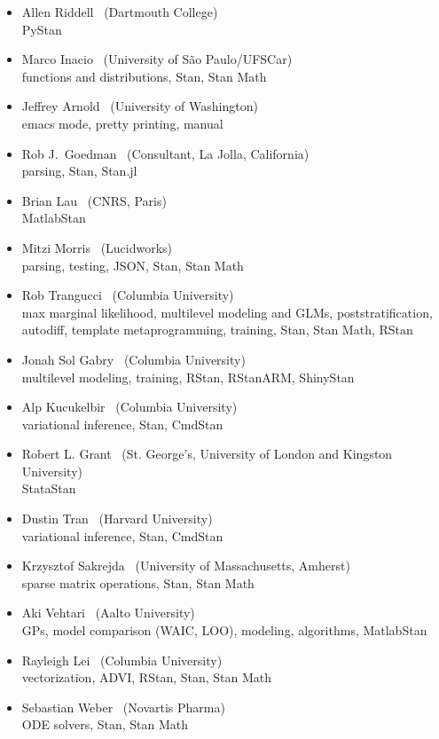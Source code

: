 \begin{itemize}
\\ {\footnotesize modeling, Stan, RStan}
\item Allen Riddell \   (Dartmouth College)
\\ {\footnotesize PyStan}
\item Marco Inacio \   (University of S\~{a}o Paulo/UFSCar)
\\ {\footnotesize functions and distributions, Stan, Stan Math}
\item Jeffrey Arnold \   (University of Washington)
\\ {\footnotesize emacs mode, pretty printing, manual}
\item Rob J.\ Goedman \ (Consultant, La Jolla, California)
\\ {\footnotesize parsing, Stan, Stan.jl}
\item Brian Lau \ (CNRS, Paris)
\\ {\footnotesize MatlabStan}
\item Mitzi Morris \   (Lucidworks)
\\ {\footnotesize parsing, testing, JSON, Stan, Stan Math}
\item Rob Trangucci \   (Columbia University)
\\ {\footnotesize max marginal likelihood, multilevel modeling and
  GLMs, poststratification, autodiff, template metaprogramming, 
  training, Stan, Stan Math, RStan}
\item Jonah Sol Gabry \ (Columbia University)
\\ {\footnotesize multilevel modeling, training, RStan, RStanARM, ShinyStan}
\item Alp Kucukelbir \ (Columbia University)
\\ {\footnotesize variational inference, Stan, CmdStan}
\item Robert L. Grant \ (St. George's, University of London and
  Kingston University)
\\ {\footnotesize StataStan}
\item Dustin Tran \ (Harvard University)
\\ {\footnotesize variational inference, Stan, CmdStan}
\item Krzysztof Sakrejda \ (University of Massachusetts, Amherst)
\\ {\footnotesize sparse matrix operations, Stan, Stan Math}
\item Aki Vehtari \ (Aalto University)
\\ {\footnotesize GPs, model comparison (WAIC, LOO), modeling,
  algorithms, MatlabStan}
\item Rayleigh Lei \ (Columbia University)
\\ {\footnotesize vectorization, ADVI, RStan, Stan, Stan Math}
\item Sebastian Weber \ (Novartis Pharma)
\\ {\footnotesize ODE solvers, Stan, Stan Math}
\end{itemize}

